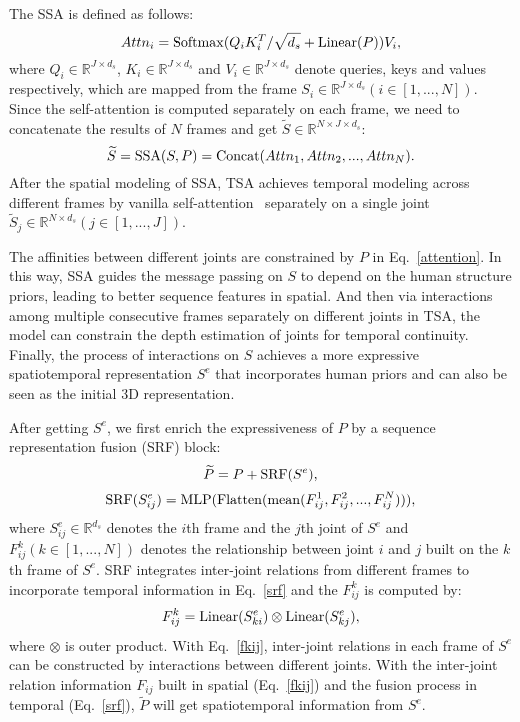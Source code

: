 \documentclass{article}
\begin{document}
The SSA is defined as follows:
\begin{equation}
    Attn_i = {\rm Softmax}(Q_iK_i^T/\sqrt{d_s}+{\rm Linear}(P))V_i,\label{attention}
\end{equation}
where $Q_i\in\mathbb R^{J\times d_s}$, $K_i\in\mathbb R^{J\times d_s}$ and $V_i\in\mathbb R^{J\times d_s}$ 
denote queries, keys and values~\cite{vaswani2017attention} respectively, which are mapped from the frame $S_i\in\mathbb R^{J\times d_s} (i\in[1,...,N])$. Since the self-attention is computed separately on each frame, we need to concatenate the results of $N$ frames and get $\widetilde S\in\mathbb R^{N\times J\times d_s}$:
\begin{equation}
    \widetilde S = {\rm SSA}(S, P) = {\rm Concat}(Attn_1, Attn_2, ..., Attn_N).\label{ssa}
\end{equation}
After the spatial modeling of SSA, TSA achieves temporal modeling across different frames by vanilla self-attention~\cite{vaswani2017attention} separately on a single joint $\widetilde S_j\in\mathbb R^{N\times d_s} (j\in[1,...,J])$.

The affinities between different joints are constrained by $P$ in Eq.~\ref{attention}. In this way, SSA guides the message passing on $S$ to depend on the human structure priors, leading to better sequence features in spatial. And then via interactions among multiple consecutive frames separately on different joints in TSA, the model can constrain the depth estimation of joints for temporal continuity. Finally, the process of interactions on $S$ achieves a more expressive spatiotemporal representation $S^e$ that incorporates human priors and can also be seen as the initial 3D representation.

 After getting $S^e$, we first enrich the expressiveness of $P$ by a sequence representation fusion (SRF) block:
\begin{equation}
    \widetilde P = P + {\rm SRF}(S^e),
\end{equation}
\begin{equation}\label{srf}
    {\rm SRF}(S^e_{ij}) = {\rm MLP}({\rm Flatten}({\rm mean}(F^1_{ij}, F^2_{ij}, ..., F^N_{ij}))),\end{equation}
where $S^e_{ij}\in\mathbb R^{d_s}$ denotes the $i$th frame and the $j$th joint of $S^e$ and $F^k_{ij} (k\in[1,...,N])$ denotes the relationship between joint $i$ and $j$ built on the $k$th frame of $S^e$. 
SRF integrates inter-joint relations from different frames to incorporate temporal information in Eq.~\ref{srf} and the $F^k_{ij}$ is computed by:
\begin{equation}
    F^k_{ij} = {\rm Linear}(S^e_{ki})\otimes {\rm Linear}(S^e_{kj}),\label{fkij}
\end{equation}
where $\otimes$ is outer product. With Eq.~\ref{fkij}, inter-joint relations in each frame of $S^e$ can be constructed by interactions between different joints. With the inter-joint relation information $F_{ij}$ built in spatial (Eq.~\ref{fkij}) and the fusion process in temporal (Eq.~\ref{srf}), $\widetilde P$ will get spatiotemporal information from $S^e$.
\end{document}
